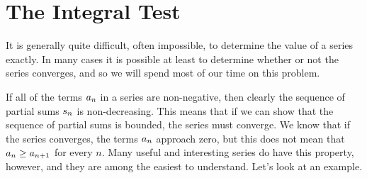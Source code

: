 \chapter{The Integral Test}{}{}

\nobreak
It is generally quite difficult, often impossible, to determine
the value of a series exactly. In many cases it is possible at least
to determine whether or not the series converges, and so we will spend
most of our time on this problem.

If all of the terms $\displaystyle a_n$ in a series are non-negative, then clearly 
the sequence of partial sums $\displaystyle s_n$ is non-decreasing. This means that
if we can show that the sequence of partial sums is bounded, the
series must converge. We know that if the series converges, the terms
$\displaystyle a_n$ approach zero, but this does not mean that $\displaystyle a_n\ge a_{n+1}$ for
every $n$. Many useful and interesting series do have this property,
however, and they are among the easiest to understand. Let's look at
an example.

